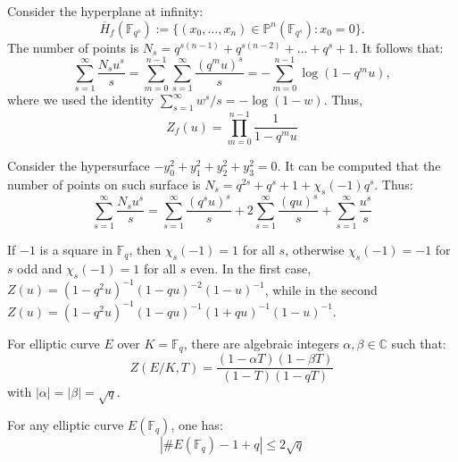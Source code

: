 \documentclass{template}
\begin{document}
\begin{example}[Hyperplane]
    Consider the hyperplane at infinity:
    \begin{equation*}
        \overline{H}_f(\mathbb{F}_{q^s}) := \{(x_0,\dots,x_n) \in \mathbb{P}^{n}(\mathbb{F}_{q^s}): x_0 = 0\}.
    \end{equation*}
    The number of points is $N_s = q^{s(n-1)}+q^{s(n-2)}+\dots+q^s+1$. It follows that:
    \begin{equation*}
        \sum_{s=1}^{\infty} \frac{N_su^s}{s} = \sum_{m=0}^{n-1}\sum_{s=1}^{\infty}\frac{(q^mu)^s}{s} = -\sum_{m=0}^{n-1}\log(1-q^mu),
    \end{equation*}
    where we used the identity $\sum_{s=1}^{\infty}w^s/s = -\log(1-w)$. Thus,
    \begin{equation*}
        Z_f(u) = \prod_{m=0}^{n-1} \frac{1}{1-q^mu}
    \end{equation*}
\end{example}

\begin{example}
    Consider the hypersurface $-y_0^2+y_1^2+y_2^2+y_3^2=0$. It can be computed
    that the number of points on such surface is
    $N_s=q^{2s}+q^s+1+\chi_s(-1)q^s$. Thus:
    \begin{equation*}
        \sum_{s=1}^{\infty}\frac{N_su^s}{s} = \sum_{s=1}^{\infty}\frac{(q^su)^s}{s} + 2\sum_{s=1}^{\infty}\frac{(qu)^s}{s} + \sum_{s=1}^{\infty}\frac{u^s}{s}
    \end{equation*}

    If $-1$ is a square in $\mathbb{F}_q$, then $\chi_s(-1)=1$ for all $s$,
    otherwise $\chi_s(-1) = -1$ for $s$ odd and $\chi_s(-1)=1$ for all $s$ even.
    In the first case, $Z(u) = (1-q^2u)^{-1}(1-qu)^{-2}(1-u)^{-1}$, while in the
    second $Z(u) = (1-q^2u)^{-1}(1-qu)^{-1}(1+qu)^{-1}(1-u)^{-1}$.
\end{example}

\begin{example}
    For elliptic curve $E$ over $K=\mathbb{F}_q$, there are algebraic integers
    $\alpha,\beta \in \mathbb{C}$ such that:
    \begin{equation*}
        Z(E/K, T) = \frac{(1-\alpha T)(1-\beta T)}{(1-T)(1-qT)}
    \end{equation*}
    with $|\alpha| = |\beta| = \sqrt{q}$.
\end{example}

\begin{lemma}
    For any elliptic curve $E(\mathbb{F}_q)$, one has:
    \begin{equation*}
        |\#E(\mathbb{F}_q) - 1 + q| \leq 2\sqrt{q}
    \end{equation*}
\end{lemma}
\end{document}
